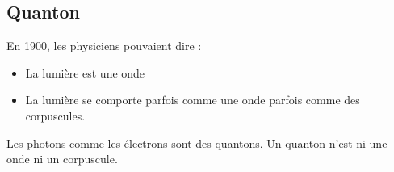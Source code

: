 \subsection{Quanton}

En 1900, les physiciens pouvaient dire : 

\begin{itemize}[leftmargin=1cm, label=, itemsep=3pt]
\item La lumière est une onde
\item La lumière se comporte parfois comme une onde parfois comme des corpuscules.
\end{itemize}

Les photons comme les électrons sont des quantons. Un quanton n'est ni une onde ni un corpuscule.

\subsection{}\subsection{}
\begin{center}
\end{center}

